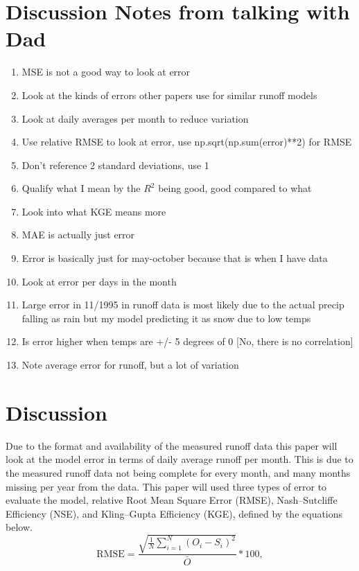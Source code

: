 \documentclass{article}
\begin{document}
\section{Discussion Notes from talking with Dad}
\begin{enumerate}
    \item MSE is not a good way to look at error
    \item Look at the kinds of errors other papers use for similar runoff models
    \item Look at daily averages per month to reduce variation
    \item Use relative RMSE to look at error, use np.sqrt(np.sum(error)**2) for RMSE
    \item Don't reference 2 standard deviations, use 1
    \item Qualify what I mean by the $R^2$ being good, good compared to what
    \item Look into what KGE means more
    \item MAE is actually just error
    \item Error is basically just for may-october because that is when I have data
    \item Look at error per days in the month
    \item Large error in 11/1995 in runoff data is most likely due to the actual precip falling as rain but my model predicting it as snow due to low temps
    \item Is error higher when temps are +/- 5 degrees of 0 [No, there is no correlation]
    \item Note average error for runoff, but a lot of variation
\end{enumerate}

\section{Discussion}
Due to the format and availability of the measured runoff data this paper will look at the model error in terms of daily average runoff per month. 
This is due to the measured runoff data not being complete for every month, and many months missing per year from the data. This paper will used 
three types of error to evaluate the model, relative Root Mean Square Error (RMSE), Nash–Sutcliffe Efficiency (NSE), and Kling–Gupta Efficiency 
(KGE), defined by the equations below. 
\begin{equation}
    \mathrm{RMSE} = \frac{\sqrt{\frac{1}{N}\sum_{i=1}^{N} \left( O_i - S_i \right)^2}}{\bar{O}}*100,
\end{equation}
\end{document}
